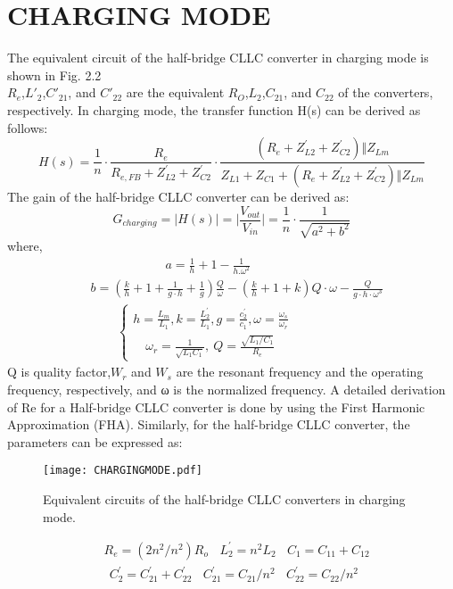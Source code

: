 \documentclass{book}
\begin{document}
\section{CHARGING MODE}
The equivalent circuit of the half-bridge CLLC converter in charging mode is shown in Fig. 2.2 \\\( R_{e}  \),\( L'_{2}  \),\( C'_{21}  \), and \( C'_{22}  \) are the equivalent \( R_{O}  \),\( L_{2}  \),\( C_{21}  \), and \( C_{22}  \)   of the converters, respectively.
In charging mode, the transfer function H(s) can be derived as follows:
\begin{equation*} H(s)= \frac{1}{n}\cdot\frac{R_{e}}{R_{e, FB}+Z_{L2}^{\prime}+Z_{C2}^{\prime}}\cdot \frac{(R_{e}+Z_{L2}^{\prime}+Z_{C2}^{\prime})\Vert Z_{Lm}} {Z_{L1}+Z_{C1}+(R_{e}+Z_{L2}^{\prime}+Z_{C2}^{\prime})\Vert Z_{Lm}}  \end{equation*}
The gain of the half-bridge CLLC converter can be derived as:
\begin{equation*} G_{charging}=\vert H(s)\vert =\vert \frac{V_{out}}{V_{in}}\vert =\frac{1}{n}\cdot\frac{1}{\sqrt{a^{2}+b^{2}}}  \end{equation*}
where, 
\begin{align*} &\qquad\qquad\qquad a= \frac{1}{h}+1-\frac{1}{h.\omega^{2}} \\ &b=\left(\frac{k}{h}+1+\frac{1}{g\cdot h}+\frac{1}{g}\right)\frac{Q}{\omega}-(\frac{k}{h}+1+k) Q\cdot\omega-\frac{Q}{g\cdot h\cdot\omega^{3}} \\ &\quad\ \ \ \ \ \begin{cases} h=\frac{L_{m}}{L_{1}}, k=\frac{L_{2}^{\prime}}{L_{1}}, g=\frac{c_{2}^{\prime}}{c_{1}}, \omega=\frac{\omega_{s}}{\omega_{r}}\\ \quad\omega_{r}=\frac{1}{\sqrt{L_{1}C_{1}}}, \ Q=\frac{\sqrt{L_{1}/C_{1}}}{R_{e}} \end{cases} \end{align*}
Q is quality factor,\( W_{r}  \) and \( W_{s}  \) are the resonant frequency and the operating frequency, respectively, and ω is the normalized frequency.
A detailed derivation of Re for a Half-bridge CLLC converter is done  by using the First Harmonic Approximation (FHA). Similarly, for the half-bridge CLLC converter, the parameters can be expressed as:
\begin{figure}[ht]
    
		\centering
		\texttt{[image: CHARGINGMODE.pdf]} %
		\caption{Equivalent circuits of the half-bridge CLLC converters in charging mode.}
	\end{figure}
    \begin{equation*}\begin{split} &R_{e}=(2n^{2}/n^{2}) R_{o}\ \ \ \ L_{2}^{\prime}=n^{2}L_{2}\ \ \ \ C_{1}=C_{11}+C_{12}\\ &\ \ C_{2}^{\prime}=C_{21}^{\prime}+C_{22}^{\prime}\ \ \ \ C_{21}^{\prime}=C_{21}/n^{2} \ \ \ \ C_{22}^{\prime}=C_{22}/n^{2} \end{split} \end{equation*}
\\[0.5cm]
\end{document}
